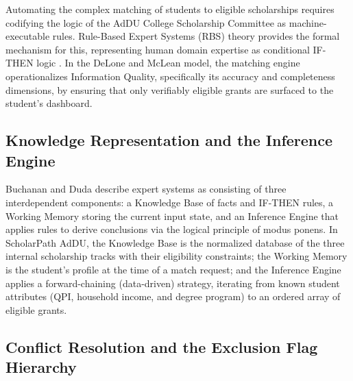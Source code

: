 Automating the complex matching of students to eligible scholarships requires codifying the logic of the AdDU College Scholarship Committee as machine-executable rules. Rule-Based Expert Systems (RBS) theory provides the formal mechanism for this, representing human domain expertise as conditional IF-THEN logic \cite{ref15}. In the DeLone and McLean \cite{ref20} model, the matching engine operationalizes Information Quality, specifically its accuracy and completeness dimensions, by ensuring that only verifiably eligible grants are surfaced to the student's dashboard.

\subsection{Knowledge Representation and the Inference Engine}

Buchanan and Duda \cite{ref15} describe expert systems as consisting of three interdependent components: a Knowledge Base of facts and IF-THEN rules, a Working Memory storing the current input state, and an Inference Engine that applies rules to derive conclusions via the logical principle of modus ponens. In ScholarPath AdDU, the Knowledge Base is the normalized database of the three internal scholarship tracks with their eligibility constraints; the Working Memory is the student's profile at the time of a match request; and the Inference Engine applies a forward-chaining (data-driven) strategy, iterating from known student attributes (QPI, household income, and degree program) to an ordered array of eligible grants.

\subsection{Conflict Resolution and the Exclusion Flag Hierarchy}

